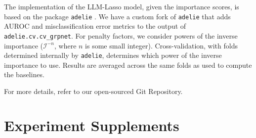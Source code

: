 The implementation of the LLM-Lasso model, given the importance scores, is based on the package \texttt{adelie} \cite{yang2024fastscalablepathwisesolvergroup}.
We have a custom fork of \texttt{adelie} that adds AUROC and misclassification error metrics to the output of \texttt{adelie.cv.cv\_grpnet}.
For penalty factors, we consider powers of the inverse importance ($\mathcal{I}^{-n}$, where $n$ is some small integer).
Cross-validation, with folds determined internally by \texttt{adelie}, determines which power of the inverse importance to use.
Results are averaged across the same folds as used to compute the baselines.

For more details, refer to our open-sourced Git Repository. %

\section{Experiment Supplements}\label{sec:exp_supp}

